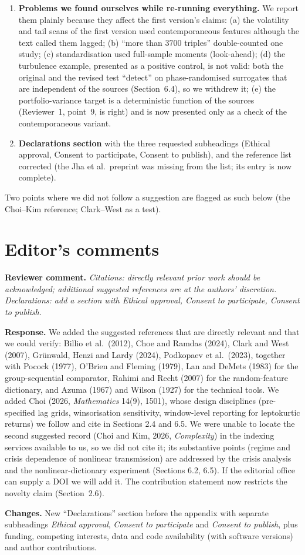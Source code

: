 \documentclass[11pt,a4paper]{article}
\newcommand{\rev}[1]{\par\noindent\textbf{Reviewer comment.} \emph{#1}}
\newcommand{\resp}{\par\noindent\textbf{Response.} }
\newcommand{\chg}{\par\noindent\textbf{Changes.} }
\begin{document}
\begin{enumerate}
\item \textbf{Problems we found ourselves while re-running everything.} We report them plainly because they affect the first version's claims: (a) the volatility and tail scans of the first version used contemporaneous features although the text called them lagged; (b) ``more than $3700$ triples'' double-counted one study; (c) standardisation used full-sample moments (look-ahead); (d) the turbulence example, presented as a positive control, is not valid: both the original and the revised test ``detect'' on phase-randomised surrogates that are independent of the sources (Section~6.4), so we withdrew it; (e) the portfolio-variance target is a deterministic function of the sources (Reviewer~1, point~9, is right) and is now presented only as a check of the contemporaneous variant.
\item \textbf{Declarations section} with the three requested subheadings (Ethical approval, Consent to participate, Consent to publish), and the reference list corrected (the Jha et al.\ preprint was missing from the list; its entry is now complete).
\end{enumerate}

Two points where we did not follow a suggestion are flagged as such below (the Choi--Kim reference; Clark--West as a test).

\section*{Editor's comments}

\rev{Citations: directly relevant prior work should be acknowledged; additional suggested references are at the authors' discretion. Declarations: add a section with Ethical approval, Consent to participate, Consent to publish.}
\resp We added the suggested references that are directly relevant and that we could verify: Billio et al.\ (2012), Choe and Ramdas (2024), Clark and West (2007), Gr\"unwald, Henzi and Lardy (2024), Podkopaev et al.\ (2023), together with Pocock (1977), O'Brien and Fleming (1979), Lan and DeMets (1983) for the group-sequential comparator, Rahimi and Recht (2007) for the random-feature dictionary, and Azuma (1967) and Wilson (1927) for the technical tools. We added Choi (2026, \emph{Mathematics} 14(9), 1501), whose design disciplines (pre-specified lag grids, winsorisation sensitivity, window-level reporting for leptokurtic returns) we follow and cite in Sections 2.4 and 6.5. We were unable to locate the second suggested record (Choi and Kim, 2026, \emph{Complexity}) in the indexing services available to us, so we did not cite it; its substantive points (regime and crisis dependence of nonlinear transmission) are addressed by the crisis analysis and the nonlinear-dictionary experiment (Sections 6.2, 6.5). If the editorial office can supply a DOI we will add it. The contribution statement now restricts the novelty claim (Section~2.6).
\chg New ``Declarations'' section before the appendix with separate subheadings \emph{Ethical approval}, \emph{Consent to participate} and \emph{Consent to publish}, plus funding, competing interests, data and code availability (with software versions) and author contributions.
\end{document}
